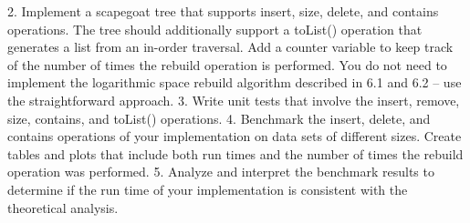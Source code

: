 \documentclass{labReport}
\begin{document}
2. Implement a scapegoat tree that supports insert, size, delete, and contains operations. The tree
should additionally support a toList() operation that generates a list from an in-order traversal.
Add a counter variable to keep track of the number of times the rebuild operation is performed.
You do not need to implement the logarithmic space rebuild algorithm described in 6.1 and 6.2 –
use the straightforward approach.
3. Write unit tests that involve the insert, remove, size, contains, and toList() operations.
4. Benchmark the insert, delete, and contains operations of your implementation on data sets of
different sizes. Create tables and plots that include both run times and the number of times the
rebuild operation was performed.
5. Analyze and interpret the benchmark results to determine if the run time of your implementation
is consistent with the theoretical analysis.


\end{document}
